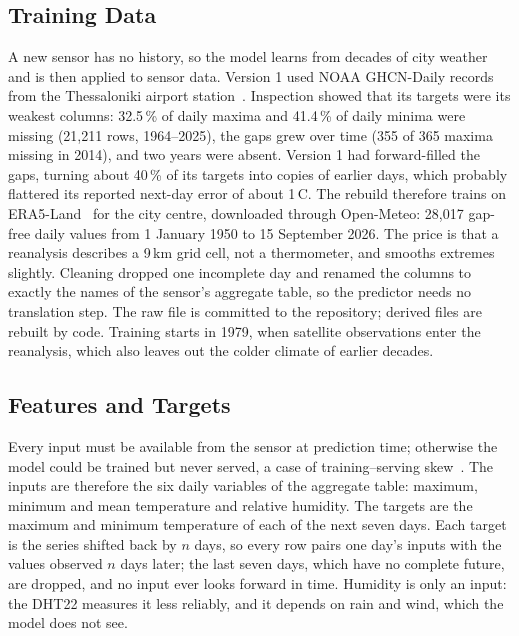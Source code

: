 \documentclass[conference]{IEEEtran}
\newcommand{\degc}{\,\textdegree C}
\begin{document}
\subsection{Training Data}
A new sensor has no history, so the model learns from decades of city weather and is then applied to sensor data. Version 1 used NOAA GHCN-Daily records from the Thessaloniki airport station~\cite{b11}. Inspection showed that its targets were its weakest columns: 32.5\,\% of daily maxima and 41.4\,\% of daily minima were missing (21,211 rows, 1964--2025), the gaps grew over time (355 of 365 maxima missing in 2014), and two years were absent. Version 1 had forward-filled the gaps, turning about 40\,\% of its targets into copies of earlier days, which probably flattered its reported next-day error of about 1\degc{}. The rebuild therefore trains on ERA5-Land~\cite{b7,b12} for the city centre, downloaded through Open-Meteo: 28,017 gap-free daily values from 1 January 1950 to 15 September 2026. The price is that a reanalysis describes a 9\,km grid cell, not a thermometer, and smooths extremes slightly. Cleaning dropped one incomplete day and renamed the columns to exactly the names of the sensor's aggregate table, so the predictor needs no translation step. The raw file is committed to the repository; derived files are rebuilt by code. Training starts in 1979, when satellite observations enter the reanalysis, which also leaves out the colder climate of earlier decades.

\subsection{Features and Targets}
Every input must be available from the sensor at prediction time; otherwise the model could be trained but never served, a case of training--serving skew~\cite{b13}. The inputs are therefore the six daily variables of the aggregate table: maximum, minimum and mean temperature and relative humidity. The targets are the maximum and minimum temperature of each of the next seven days. Each target is the series shifted back by $n$ days, so every row pairs one day's inputs with the values observed $n$ days later; the last seven days, which have no complete future, are dropped, and no input ever looks forward in time. Humidity is only an input: the DHT22 measures it less reliably, and it depends on rain and wind, which the model does not see.
\end{document}
